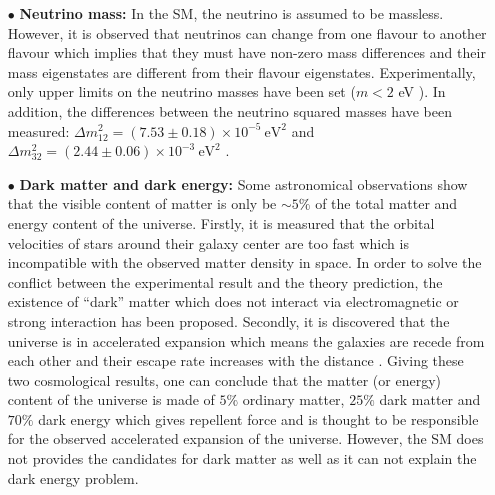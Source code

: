 \begin{enumerate}

\item[$\bullet$]\textbf{Neutrino mass:} In the SM, the neutrino is assumed to be massless. However, it is observed that neutrinos can change from one flavour to another flavour which implies that they must have non-zero mass differences \cite{Fukuda:1998mi,Abe:2011fz} and their mass eigenstates are different from their flavour eigenstates. Experimentally, only upper limits on the neutrino masses have been set ($m<2$ eV \cite{Olive:2016xmw}). In addition, the differences between the neutrino squared masses have been measured: $\Delta m_{12}^{2}=(7.53\pm 0.18)\times10^{-5}~\mathrm{eV^{2}}$ and $\Delta m_{32}^{2}=(2.44\pm 0.06)\times10^{-3}~ \mathrm{eV^{2}}$ \cite{1674-1137-38-9-090001}.


\item[$\bullet$]\textbf{Dark matter and dark energy:} Some astronomical observations show that the visible content of matter is only be $\sim5\%$ of the total matter and energy content of the universe. Firstly, it is measured that the orbital velocities of stars around their galaxy center are too fast \cite{Rubin:1970zza,Freese:2008cz} which is incompatible with the observed matter density in space.
    In order to solve the conflict between the experimental result and the theory prediction, the existence of ``dark'' matter which does not interact via electromagnetic or strong interaction has been proposed.
    Secondly, it is discovered that the universe is in accelerated expansion which means the galaxies are recede from each other and their escape rate increases with the distance \cite{Riess:1998cb,Perlmutter:1998np}. Giving these two cosmological results, one can conclude that the matter (or energy) content of the universe is made of $5\%$ ordinary matter, $25\%$ dark matter and $70\%$ dark energy which gives repellent force and is thought to be responsible for the observed accelerated expansion of the universe. However, the SM does not provides the candidates for dark matter as well as it can not explain the dark energy problem.


\end{enumerate}
